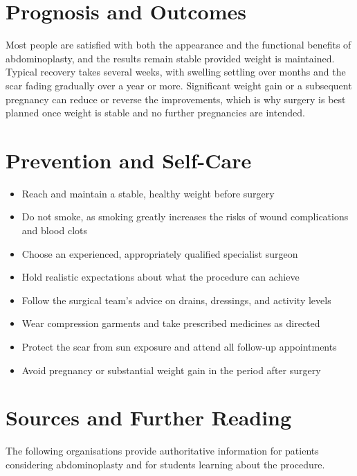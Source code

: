 \section*{Prognosis and Outcomes}
Most people are satisfied with both the appearance and the functional benefits of abdominoplasty, and the results remain stable provided weight is maintained. Typical recovery takes several weeks, with swelling settling over months and the scar fading gradually over a year or more. Significant weight gain or a subsequent pregnancy can reduce or reverse the improvements, which is why surgery is best planned once weight is stable and no further pregnancies are intended.

\section*{Prevention and Self-Care}
\begin{itemize}
    \item Reach and maintain a stable, healthy weight before surgery
    \item Do not smoke, as smoking greatly increases the risks of wound complications and blood clots
    \item Choose an experienced, appropriately qualified specialist surgeon
    \item Hold realistic expectations about what the procedure can achieve
    \item Follow the surgical team's advice on drains, dressings, and activity levels
    \item Wear compression garments and take prescribed medicines as directed
    \item Protect the scar from sun exposure and attend all follow-up appointments
    \item Avoid pregnancy or substantial weight gain in the period after surgery
\end{itemize}

\section*{Sources and Further Reading}
The following organisations provide authoritative information for patients considering abdominoplasty and for students learning about the procedure.

